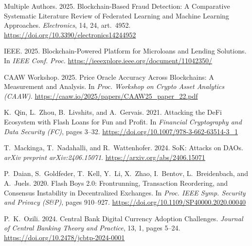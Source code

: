 \documentclass[12pt,a4paper]{report}
\begin{document}
{\begin{enumerate}[label={[\arabic*]}]
\item Multiple Authors. 2025. Blockchain-Based Fraud Detection: A Comparative Systematic Literature Review of Federated Learning and Machine Learning Approaches. \emph{Electronics}, 14, 24, art.~4952. \url{https://doi.org/10.3390/electronics14244952}

\item IEEE. 2025. Blockchain-Powered Platform for Microloans and Lending Solutions. In \emph{IEEE Conf. Proc.} \url{https://ieeexplore.ieee.org/document/11042350/}

\item CAAW Workshop. 2025. Price Oracle Accuracy Across Blockchains: A Measurement and Analysis. In \emph{Proc. Workshop on Crypto Asset Analytics (CAAW)}. \url{https://caaw.io/2025/papers/CAAW25_paper_22.pdf}

\item K.~Qin, L.~Zhou, B.~Livshits, and A.~Gervais. 2021. Attacking the DeFi Ecosystem with Flash Loans for Fun and Profit. In \emph{Financial Cryptography and Data Security (FC)}, pages 3--32. \url{https://doi.org/10.1007/978-3-662-63514-3_1}

\item T.~Mackinga, T.~Nadahalli, and R.~Wattenhofer. 2024. SoK: Attacks on DAOs. \emph{arXiv preprint arXiv:2406.15071}. \url{https://arxiv.org/abs/2406.15071}

\item P.~Daian, S.~Goldfeder, T.~Kell, Y.~Li, X.~Zhao, I.~Bentov, L.~Breidenbach, and A.~Juels. 2020. Flash Boys 2.0: Frontrunning, Transaction Reordering, and Consensus Instability in Decentralized Exchanges. In \emph{Proc. IEEE Symp. Security and Privacy (S\&P)}, pages 910--927. \url{https://doi.org/10.1109/SP40000.2020.00040}

\item P.~K.~Ozili. 2024. Central Bank Digital Currency Adoption Challenges. \emph{Journal of Central Banking Theory and Practice}, 13, 1, pages 5--24. \url{https://doi.org/10.2478/jcbtp-2024-0001}

\end{enumerate}
}
\end{document}
